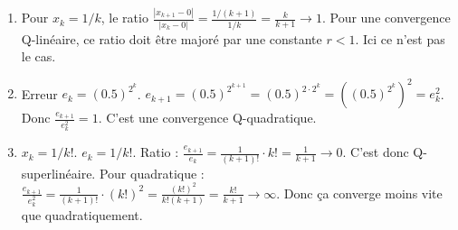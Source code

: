 \begin{correction}
\begin{enumerate}
    \item Pour $x_k = 1/k$, le ratio $\frac{|x_{k+1}-0|}{|x_k-0|} = \frac{1/(k+1)}{1/k} = \frac{k}{k+1} \to 1$. Pour une convergence Q-linéaire, ce ratio doit être majoré par une constante $r < 1$. Ici ce n'est pas le cas.
    \item Erreur $e_k = (0.5)^{2^k}$.
    $e_{k+1} = (0.5)^{2^{k+1}} = (0.5)^{2 \cdot 2^k} = ((0.5)^{2^k})^2 = e_k^2$.
    Donc $\frac{e_{k+1}}{e_k^2} = 1$. C'est une convergence Q-quadratique.
    \item $x_k = 1/k!$. $e_k = 1/k!$.
    Ratio : $\frac{e_{k+1}}{e_k} = \frac{1}{(k+1)!} \cdot k! = \frac{1}{k+1} \to 0$. C'est donc Q-superlinéaire.
    Pour quadratique : $\frac{e_{k+1}}{e_k^2} = \frac{1}{(k+1)!} \cdot (k!)^2 = \frac{(k!)^2}{k!(k+1)} = \frac{k!}{k+1} \to \infty$.
    Donc ça converge moins vite que quadratiquement.
\end{enumerate}
\end{correction}
\bigskip

